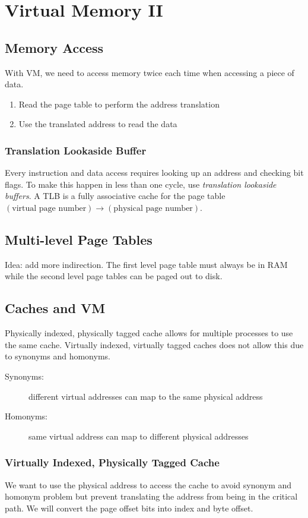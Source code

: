 \chapter{Virtual Memory II}

\section{Memory Access}
With VM, we need to access memory twice each time when accessing a piece of data.
\begin{enumerate}
    \item Read the page table to perform the address translation
    \item Use the translated address to read the data
\end{enumerate}

\subsection{Translation Lookaside Buffer}
Every instruction and data access requires looking up an address and checking bit flags. To make this happen in less than one cycle, use \emph{translation lookaside buffers}. A TLB is a fully associative cache for the page table \((\text{virtual page number})\to(\text{physical page number})\).

\section{Multi-level Page Tables}
Idea: add more indirection. The first level page table must always be in RAM while the second level page tables can be paged out to disk.

\section{Caches and VM}

Physically indexed, physically tagged cache allows for multiple processes to use the same cache. Virtually indexed, virtually tagged caches does not allow this due to synonyms and homonyms.

\begin{description}
    \item[Synonyms:] different virtual addresses can map to the same physical address
    \item[Homonyms:] same virtual address can map to different physical addresses
\end{description}

\subsection{Virtually Indexed, Physically Tagged Cache}
We want to use the physical address to access the cache to avoid synonym and homonym problem but prevent translating the address from being in the critical path. We will convert the page offset bits into index and byte offset.